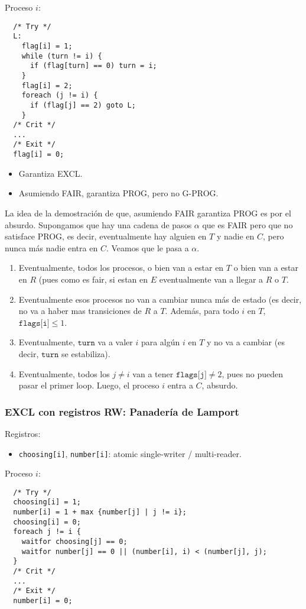 \documentclass[11pt, spanish]{report}
\begin{document}
Proceso $i$:
\begin{lstlisting}
  /* Try */
  L:
    flag[i] = 1;
    while (turn != i) {
      if (flag[turn] == 0) turn = i;
    }
    flag[i] = 2;
    foreach (j != i) {
      if (flag[j] == 2) goto L;
    }
  /* Crit */
  ...
  /* Exit */
  flag[i] = 0;
\end{lstlisting}

\begin{itemize}
  \item Garantiza EXCL.
  \item Asumiendo FAIR, garantiza PROG, pero no G-PROG.
\end{itemize}

La idea de la demostración de que, asumiendo FAIR garantiza PROG es por el absurdo.
Supongamos que hay una cadena de pasos $\alpha$ que es FAIR pero que no satisface PROG, es decir, eventualmente hay alguien en $T$ y nadie en $C$, pero nunca más nadie entra en $C$.
Veamos que le pasa a $\alpha$.
\begin{enumerate}
  \item Eventualmente, todos los procesos, o bien van a estar en $T$ o bien van a estar en $R$ (pues como es fair, si estan en $E$ eventualmente van a llegar a $R$ o $T$.
  \item Eventualmente esos procesos no van a cambiar nunca más de estado (es decir, no va a haber mas transiciones de $R$ a $T$. Además, para todo $i$ en $T$, $\texttt{flags[i]} \leq 1$.
  \item Eventualmente, $\texttt{turn}$ va a valer $i$ para algún $i$ en $T$ y no va a cambiar (es decir, $\texttt{turn}$ se estabiliza).
  \item Eventualmente, todos los $j \neq i$ van a tener $\texttt{flags[j]} \neq 2$, pues no pueden pasar el primer loop. Luego, el proceso $i$ entra a $C$, absurdo.
\end{enumerate}


\subsubsection{EXCL con registros RW: Panadería de Lamport}
Registros:
\begin{itemize}
  \item \texttt{choosing[i]}, \texttt{number[i]}: atomic single-writer / multi-reader.
\end{itemize}

Proceso $i$:
\begin{lstlisting}
  /* Try */
  choosing[i] = 1;
  number[i] = 1 + max {number[j] | j != i};
  choosing[i] = 0;
  foreach j != i {
    waitfor choosing[j] == 0;
    waitfor number[j] == 0 || (number[i], i) < (number[j], j);
  }
  /* Crit */
  ...
  /* Exit */
  number[i] = 0;
\end{lstlisting}
\end{document}

